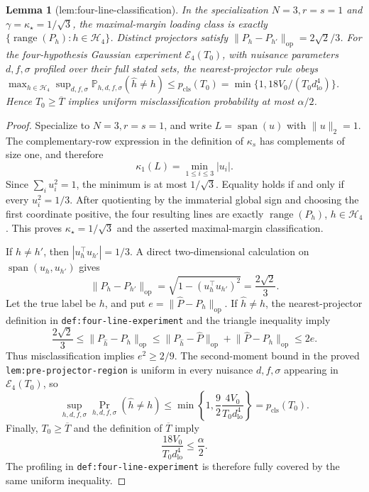 \documentclass{article}
\newtheorem{lemma}{Lemma}
\begin{document}
\begin{lemma}[lem:four-line-classification]\label{lem:four-line-classification}
In the specialization \(N=3,r=s=1\) and \(\gamma=\kappa_\star=1/\sqrt3\), the maximal-margin loading class is exactly \(\{\operatorname{range}(P_h):h\in\mathcal H_4\}\). Distinct projectors satisfy \(\lVert P_h-P_{h'}\rVert_{\mathrm{op}}=2\sqrt2/3\). For the four-hypothesis Gaussian experiment \(\mathcal E_4(T_0)\), with nuisance parameters \(d,f,\sigma\) profiled over their full stated sets, the nearest-projector rule obeys \(\max_{h\in\mathcal H_4}\sup_{d,f,\sigma}\mathbb P_{h,d,f,\sigma}(\widehat h\ne h)\le p_{\mathrm{cls}}(T_0)=\min\{1,18V_0/(T_0d_{\mathrm{lo}}^4)\}\). Hence \(T_0\ge\overline T\) implies uniform misclassification probability at most \(\alpha/2\).
\end{lemma}
\begin{proof}
Specialize to \(N=3,r=s=1\), and write \(L=\operatorname{span}(u)\) with \(\lVert u\rVert_2=1\).  The complementary-row expression in the definition of \(\kappa_s\) has complements of size one, and therefore
\[
 \kappa_1(L)=\min_{1\le i\le3}|u_i|.
\]
Since \(\sum_i u_i^2=1\), the minimum is at most \(1/\sqrt3\).  Equality holds if and only if every \(u_i^2=1/3\).  After quotienting by the immaterial global sign and choosing the first coordinate positive, the four resulting lines are exactly \(\operatorname{range}(P_h)\), \(h\in\mathcal H_4\).  This proves \(\kappa_\star=1/\sqrt3\) and the asserted maximal-margin classification.

If \(h\ne h'\), then \(|u_h^{\top}u_{h'}|=1/3\).  A direct two-dimensional calculation on \(\operatorname{span}(u_h,u_{h'})\) gives
\[
 \lVert P_h-P_{h'}\rVert_{\mathrm{op}}
 =\sqrt{1-(u_h^{\top}u_{h'})^2}
 =\frac{2\sqrt2}{3}.
\]
Let the true label be \(h\), and put \(e=\lVert\widehat P-P_h\rVert_{\mathrm{op}}\).  If \(\widehat h\ne h\), the nearest-projector definition in \texttt{def:four-line-experiment} and the triangle inequality imply
\[
 \frac{2\sqrt2}{3}
 \le\lVert P_{\widehat h}-P_h\rVert_{\mathrm{op}}
 \le\lVert P_{\widehat h}-\widehat P\rVert_{\mathrm{op}}
     +\lVert\widehat P-P_h\rVert_{\mathrm{op}}
 \le2e.
\]
Thus misclassification implies \(e^2\ge2/9\).  The second-moment bound in the proved \texttt{lem:pre-projector-region} is uniform in every nuisance \(d,f,\sigma\) appearing in \(\mathcal E_4(T_0)\), so
\[
 \sup_{h,d,f,\sigma}\Pr_{h,d,f,\sigma}(\widehat h\ne h)
 \le\min\left\{1,\frac{9}{2}\frac{4V_0}{T_0d_{\mathrm{lo}}^4}\right\}
 =p_{\mathrm{cls}}(T_0).
\]
Finally, \(T_0\ge\overline T\) and the definition of \(\overline T\) imply
\[
 \frac{18V_0}{T_0d_{\mathrm{lo}}^4}\le\frac\alpha2.
\]
The profiling in \texttt{def:four-line-experiment} is therefore fully covered by the same uniform inequality.
\end{proof}
\end{document}
